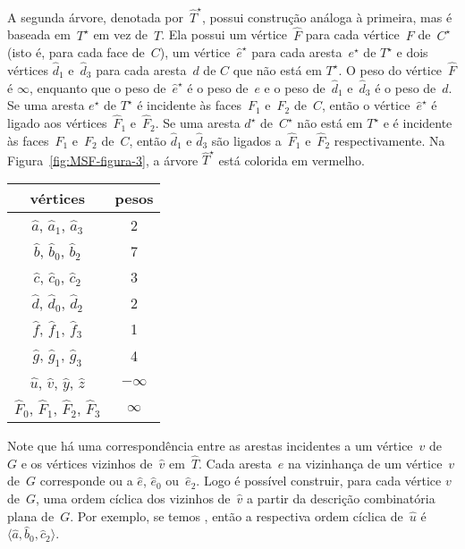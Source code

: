 A segunda árvore, denotada por~$\hat T^\star$, possui construção análoga à primeira, mas é baseada em~$T^\star$ em vez de~$T$.
Ela possui um vértice~$\hat F$ para cada vértice~$F$ de~$C^\star$ (isto é, para cada face de~$C$), um vértice~$\hat e^\star$ para cada aresta~$e^\star$ de $T^\star$ e dois vértices $\hat d_1$ e~$\hat d_3$ para cada aresta~$d$ de $C$ que não está em $T^\star$.
O peso do vértice~$\hat F$ é $\infty$, enquanto que o peso de~$\hat e^\star$ é o peso de~$e$ e o peso de~$\hat d_1$ e~$\hat d_3$ é o peso de~$d$.
Se uma aresta $e^\star$ de $T^\star$ é incidente às faces~$F_1$ e~$F_2$ de~$C$, então o vértice~$\hat e^\star$ é ligado aos vértices~$\hat F_1$ e~$\hat F_2$.
Se uma aresta $d^\star$ de~$C^\star$ não está em $T^\star$ e é incidente às faces~$F_1$ e~$F_2$ de~$C$, então $\hat d_1$ e $\hat d_3$ são ligados a~$\hat F_1$ e~$\hat F_2$ respectivamente.
Na Figura~\ref{fig:MSF-figura-3}, a árvore $\hat T^\star$ está colorida em vermelho.

\begin{minipage}[b]{0.4\textwidth}
\centering
\begin{tabular}{| c  c |} 
 \hline
 vértices & pesos\\
 \hline
 $\hat a$, $\hat a_1$, $\hat a_3$ & 2 \\ 
 \hline
 $\hat b$, $\hat b_0$, $\hat b_2$ & 7 \\
 \hline
 $\hat c$, $\hat c_0$, $\hat c_2$ & 3 \\
 \hline
 $\hat d$, $\hat d_0$, $\hat d_2$ & 2 \\
 \hline
 $\hat f$, $\hat f_1$, $\hat f_3$ & 1 \\
 \hline
 $\hat g$, $\hat g_1$, $\hat g_3$ & 4 \\
 \hline
 $\hat u$, $\hat v$, $\hat y$, $\hat z$ & $-\infty$ \\
 \hline
 $\hat F_0$, $\hat F_1$, $\hat F_2$, $\hat F_3$ & $\infty$ \\
 \hline
\end{tabular}
\end{minipage}
\hfill
\begin{minipage}[b]{0.5\textwidth}
    \centering

\label{fig:MSF-figura-3}
    \end{minipage}

Note que há uma correspondência entre as arestas incidentes a um vértice~$v$ de~$G$ e os vértices vizinhos de~$\hat v$ em~$\hat T$.
Cada aresta~$e$ na vizinhança de um vértice~$v$ de~$G$ corresponde ou a $\hat e$, $\hat e_0$ ou~$\hat e_2$. 
Logo é possível construir, para cada vértice $v$ de~$G$, uma ordem cíclica dos vizinhos de~$\hat v$ a partir da descrição combinatória plana de~$G$.
Por exemplo, se temos , então a respectiva ordem cíclica de~$\hat u$ é~$\langle \hat a, \hat b_0, \hat c_2 \rangle$.



